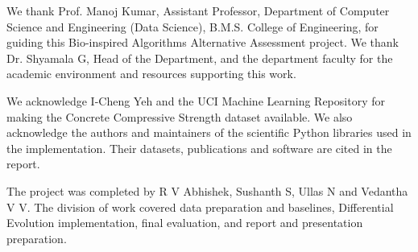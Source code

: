 We thank Prof. Manoj Kumar, Assistant Professor, Department of Computer Science and Engineering (Data Science), B.M.S. College of Engineering, for guiding this Bio-inspired Algorithms Alternative Assessment project. We thank Dr. Shyamala G, Head of the Department, and the department faculty for the academic environment and resources supporting this work.

We acknowledge I-Cheng Yeh and the UCI Machine Learning Repository for making the Concrete Compressive Strength dataset available. We also acknowledge the authors and maintainers of the scientific Python libraries used in the implementation. Their datasets, publications and software are cited in the report.

The project was completed by R V Abhishek, Sushanth S, Ullas N and Vedantha V V. The division of work covered data preparation and baselines, Differential Evolution implementation, final evaluation, and report and presentation preparation.
